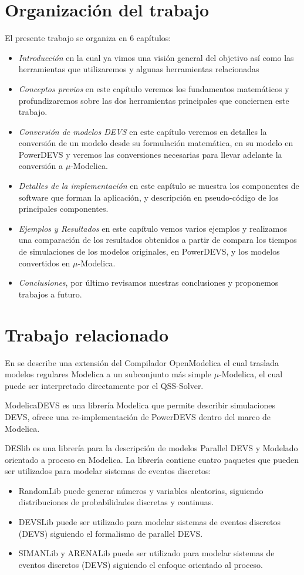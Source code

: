 \section{Organización del trabajo}
El presente trabajo se organiza en 6 capítulos:
\begin{itemize}
\item \emph{Introducción} en la cual ya vimos una visión general del objetivo así como las herramientas que utilizaremos y algunas herramientas relacionadas
\item \emph{Conceptos previos} en este capítulo veremos los fundamentos matemáticos y profundizaremos sobre las dos herramientas principales que conciernen este trabajo.
\item \emph{Conversión de modelos DEVS} en este capítulo veremos en detalles la conversión de un modelo desde su formulación matemática, en su modelo en PowerDEVS y veremos las conversiones necesarias para llevar adelante la conversión a $\mu$-Modelica.
\item \emph{Detalles de la implementación} en este capítulo se muestra los componentes de software que forman la aplicación, y descripción en pseudo-código de los principales componentes.
\item \emph{Ejemplos y Resultados} en este capítulo vemos varios ejemplos y realizamos una comparación de los resultados obtenidos a partir de compara los tiempos de simulaciones de los modelos originales, en PowerDEVS, y los modelos convertidos en $\mu$-Modelica.
\item \emph{Conclusiones}, por último revisamos nuestras conclusiones y proponemos trabajos a futuro.
\end{itemize}

\section{Trabajo relacionado}
En \cite{Ber12} se describe una extensión del Compilador OpenModelica el cual traslada modelos regulares Modelica a un subconjunto más simple $\mu$-Modelica, el cual puede ser interpretado directamente por el QSS-Solver.


ModelicaDEVS \cite{Beltrame06quantisedstate} es una librería Modelica que permite describir simulaciones DEVS, ofrece una re-implementación de PowerDEVS dentro del marco de Modelica.

DESlib \cite{Sanz09paralleldevs} es una librería para la descripción de modelos Parallel DEVS y Modelado orientado a proceso en Modelica.
La librería contiene cuatro paquetes que pueden ser utilizados para modelar sistemas de eventos discretos:
\begin{itemize}
\item RandomLib puede generar números y variables aleatorias, siguiendo distribuciones de probabilidades discretas y continuas.
\item DEVSLib puede ser utilizado para modelar sistemas de eventos discretos (DEVS) siguiendo el formalismo de parallel DEVS.
\item SIMANLib y ARENALib puede ser utilizado para modelar sistemas de eventos discretos (DEVS) siguiendo el enfoque orientado al proceso.
\end{itemize}

